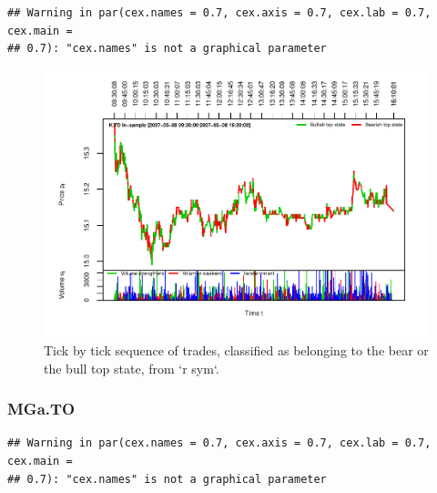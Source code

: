 \documentclass[]{article}
\begin{document}
\begin{verbatim}
## Warning in par(cex.names = 0.7, cex.axis = 0.7, cex.lab = 0.7, cex.main =
## 0.7): "cex.names" is not a graphical parameter
\end{verbatim}

\begin{figure}[H]
\includegraphics[width=\textwidth]{main_files/figure-latex/unnamed-chunk-36-1} \caption{Tick by tick sequence of trades, classified as belonging to the bear or the bull top state, from `r sym`.}\label{fig:unnamed-chunk-36}
\end{figure}

\newpage

\subsubsection{MGa.TO}\label{mga.to}

\begin{verbatim}
## Warning in par(cex.names = 0.7, cex.axis = 0.7, cex.lab = 0.7, cex.main =
## 0.7): "cex.names" is not a graphical parameter
\end{verbatim}
\end{document}

